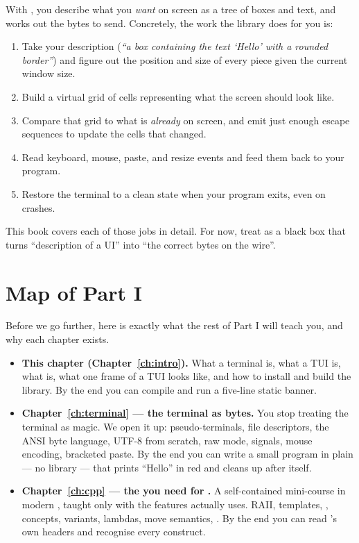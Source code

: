 With \maya{}, you describe what you \emph{want} on screen as a tree of
boxes and text, and \maya{} works out the bytes to send. Concretely,
the work the library does for you is:

\begin{enumerate}[leftmargin=*]
  \item Take your description (\emph{``a box containing the text
    `Hello' with a rounded border''}) and figure out the position
    and size of every piece given the current window size.
  \item Build a virtual grid of cells representing what the screen
    should look like.
  \item Compare that grid to what is \emph{already} on screen, and
    emit just enough escape sequences to update the cells that
    changed.
  \item Read keyboard, mouse, paste, and resize events and feed them
    back to your program.
  \item Restore the terminal to a clean state when your program
    exits, even on crashes.
\end{enumerate}

This book covers each of those jobs in detail. For now, treat
\maya{} as a black box that turns ``description of a UI'' into ``the
correct bytes on the wire''.

\section{Map of Part I}
\label{sec:intro:map}

Before we go further, here is exactly what the rest of Part I will
teach you, and why each chapter exists.

\begin{itemize}[leftmargin=*]
  \item \textbf{This chapter (Chapter~\ref{ch:intro}).} What a
    terminal is, what a TUI is, what \maya{} is, what one frame of
    a TUI looks like, and how to install and build the library.
    By the end you can compile and run a five-line static banner.
  \item \textbf{Chapter~\ref{ch:terminal} --- the terminal as
    bytes.} You stop treating the terminal as magic. We open it
    up: pseudo-terminals, file descriptors, the ANSI byte language,
    UTF-8 from scratch, raw mode, signals, mouse encoding,
    bracketed paste. By the end you can write a small program in
    plain \cpp{} --- no library --- that prints ``Hello'' in red and
    cleans up after itself.
  \item \textbf{Chapter~\ref{ch:cpp} --- the \cpp{} you need for
    \maya{}.} A self-contained mini-course in modern \cpp{}, taught
    only with the features \maya{} actually uses. RAII, templates,
    , concepts, variants, lambdas, move semantics,
    . By the end you can read \maya{}'s own headers
    and recognise every construct.
\end{itemize}

